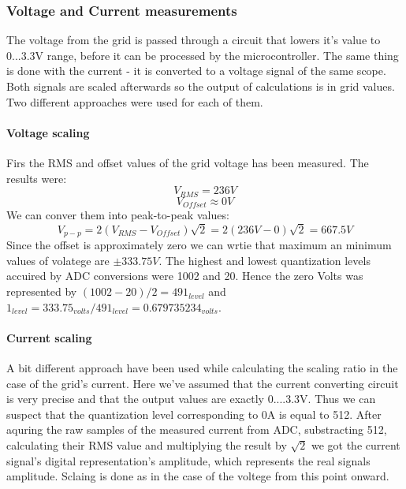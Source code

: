 \subsubsection{Voltage and Current measurements}
The voltage from the grid is passed through a circuit that lowers it's value to 0...3.3V range, before it can be processed by the microcontroller. The same thing is done with the current - it is converted to a voltage signal of the same scope. Both signals are scaled afterwards so the output of calculations is in grid values. Two different approaches were used for each of them.

\paragraph{Voltage scaling}
Firs the RMS and offset values of the grid voltage has been measured. The results were: 
\[ V_{RMS}=236V \] 
\[ V_{Offset} \approx 0V\]
We can conver them into peak-to-peak values:
\[ V_{p-p}=2(V_{RMS}-V_{Offset})\sqrt{2}=2(236V-0)\sqrt{2}=667.5V \]
Since the offset is approximately zero we can wrtie that maximum an minimum values of volatege are $ \pm333.75V $. The highest and lowest quantization levels accuired by ADC conversions were 1002 and 20. Hence the zero Volts was represented by $ (1002-20)/2=491_{level} $ and $ 1_{level}=333.75_{volts}/491_{level}=0.679735234_{volts} $.

\paragraph{Current scaling}
A bit different approach have been used while calculating the scaling ratio in the case of the grid's current. Here we've assumed that the current converting circuit is very precise and that the output values are exactly 0....3.3V. Thus we can suspect that the quantization level corresponding to 0A is equal to 512. After aquring the raw samples of the measured current from ADC, substracting 512, calculating their RMS value and multiplying the result by $ \sqrt{2} $ we got the current signal's digital representation's amplitude, which represents the real signals amplitude. Sclaing is done as in the case of the voltege from this point onward.


